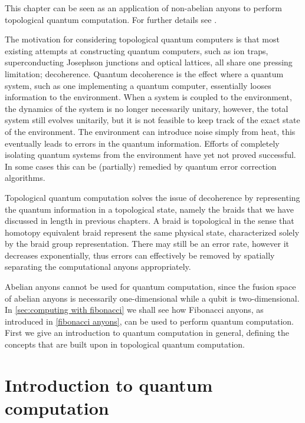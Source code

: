 \documentclass[a4paper,10pt,oneside]{book}
\theoremstyle{plain}
\theoremstyle{definition}
\theoremstyle{remark}
\begin{document}
This chapter can be seen as an application of non-abelian anyons to perform topological quantum computation. For further details see \cite{nayak,freedman kitaev larsen wang,shor fault-tolerant,braid topologies}.

The motivation for considering topological quantum computers is that most existing attempts at constructing quantum computers, such as ion traps, superconducting Josephson junctions and optical lattices, all share one pressing limitation; decoherence. Quantum decoherence is the effect where a quantum system, such as one implementing a quantum computer, essentially looses information to the environment. When a system is coupled to the environment, the dynamics of the system is no longer necessarily unitary, however, the total system still evolves unitarily, but it is not feasible to keep track of the exact state of the environment. The environment can introduce noise simply from heat, this eventually leads to errors in the quantum information. Efforts of completely isolating quantum systems from the environment have yet not proved successful. In some cases this can be (partially) remedied by quantum error correction algorithms.

Topological quantum computation solves the issue of decoherence by representing the quantum information in a topological state, namely the braids that we have discussed in length in previous chapters. A braid is topological in the sense that homotopy equivalent braid represent the same physical state, characterized solely by the braid group representation. There may still be an error rate, however it decreases exponentially, thus errors can effectively be removed by spatially separating the computational anyons appropriately. \cite{freedman kitaev larsen wang}

Abelian anyons cannot be used for quantum computation, since the fusion space of abelian anyons is necessarily one-dimensional while a qubit is two-dimensional. In \cref{sec:computing with fibonacci} we shall see how Fibonacci anyons, as introduced in \cref{fibonacci anyons}, can be used to perform quantum computation. First we give an introduction to quantum computation in general, defining the concepts that are built upon in topological quantum computation.


\section{Introduction to quantum computation}

\end{document}
